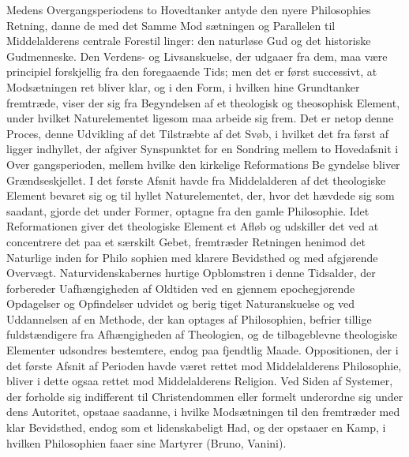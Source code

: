 \documentclass[12pt,a4paper]{book}
\begin{document}
Medens Overgangsperiodens to Hovedtanker antyde den
nyere Philosophies Retning, danne de med det Samme Mod\-%
sætningen og Parallelen til Middelalderens centrale Forestil\-%
linger: den naturløse Gud og det historiske Gudmenneske.
Den Verdens- og Livsanskuelse, der udgaaer fra dem, maa
være principiel forskjellig fra den foregaaende Tids; men det
er først successivt, at Modsætningen ret bliver klar, og i den
Form, i hvilken hine Grundtanker fremtræde, viser der sig fra
Begyndelsen af et theologisk og theosophisk Element, under
hvilket Naturelementet ligesom maa arbeide sig frem. Det er
netop denne Proces, denne Udvikling af det Tilstræbte af det
Svøb, i hvilket det fra først af ligger indhyllet, der afgiver
Synspunktet for en Sondring mellem to Hovedafsnit i Over\-%
gangsperioden, mellem hvilke den kirkelige Reformations Be\-%
gyndelse bliver Grændseskjellet. I det første Afsnit havde fra
Middelalderen af det theologiske Element bevaret sig og til\-%
hyllet Naturelementet, der, hvor det hævdede sig som saadant,
gjorde det under Former, optagne fra den gamle Philosophie.
Idet Reformationen giver det theologiske Element et Afløb og
udskiller det ved at concentrere det paa et særskilt Gebet,
fremtræder Retningen henimod det Naturlige inden for Philo\-%
sophien med klarere Bevidsthed og med afgjørende Overvægt.
Naturvidenskabernes hurtige Opblomstren i denne Tidsalder,
der forbereder Uafhængigheden af Oldtiden ved en gjennem
epochegjørende Opdagelser og Opfindelser udvidet og berig\-%
tiget Naturanskuelse og ved Uddannelsen af en Methode, der
kan optages af Philosophien, befrier tillige fuldstændigere fra
Afhængigheden af Theologien, og de tilbageblevne theologiske
Elementer udsondres bestemtere, endog paa fjendtlig Maade.
Oppositionen, der i det første Afsnit af Perioden havde været
rettet mod Middelalderens Philosophie, bliver i dette ogsaa
rettet mod Middelalderens Religion. Ved Siden af Systemer,
der forholde sig indifferent til Christendommen eller formelt
underordne sig under dens Autoritet, opstaae saadanne, i hvilke
Modsætningen til den fremtræder med klar Bevidsthed, endog
som et lidenskabeligt Had, og der opstaaer en Kamp, i hvilken
Philosophien faaer sine Martyrer (Bruno, Vanini).
\end{document}
